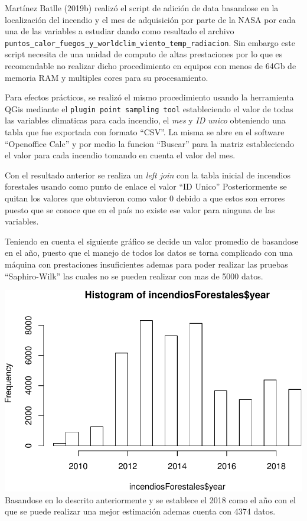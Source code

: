 \documentclass[11pt,]{article}
\begin{document}
Martínez Batlle (2019b) realizó el script de adición de data basandose
en la localización del incendio y el mes de adquisición por parte de la
NASA por cada una de las variables a estudiar dando como resultado el
archivo
\texttt{puntos\_calor\_fuegos\_y\_worldclim\_viento\_temp\_radiacion}.
Sin embargo este script necesita de una unidad de computo de altas
prestaciones por lo que es recomendable no realizar dicho procedimiento
en equipos con menos de 64Gb de memoria RAM y multiples cores para su
procesamiento.

Para efectos prácticos, se realizó el mismo procedimiento usando la
herramienta QGis mediante el \texttt{plugin\ point\ sampling\ tool}
estableciendo el valor de todas las variables climaticas para cada
incendio, el \emph{mes} y \emph{ID unico} obteniendo una tabla que fue
exportada con formato ``CSV''. La misma se abre en el software
``Openoffice Calc'' y por medio la funcion ``Buscar'' para la matriz
estableciendo el valor para cada incendio tomando en cuenta el valor del
mes.

Con el resultado anterior se realiza un \emph{left join} con la tabla
inicial de incendios forestales usando como punto de enlace el valor
``ID Unico'' Posteriormente se quitan los valores que obtuvieron como
valor 0 debido a que estos son errores puesto que se conoce que en el
país no existe ese valor para ninguna de las variables.

Teniendo en cuenta el siguiente gráfico se decide un valor promedio de
basandose en el año, puesto que el manejo de todos los datos se torna
complicado con una máquina con prestaciones insuficientes ademas para
poder realizar las pruebas ``Saphiro-Wilk'' las cuales no se pueden
realizar con mas de 5000 datos.

\includegraphics{proyecto_files/figure-latex/unnamed-chunk-33-1.pdf}
Basandose en lo descrito anteriormente y se establece el 2018 como el
año con el que se puede realizar una mejor estimación ademas cuenta con
4374 datos.
\end{document}

